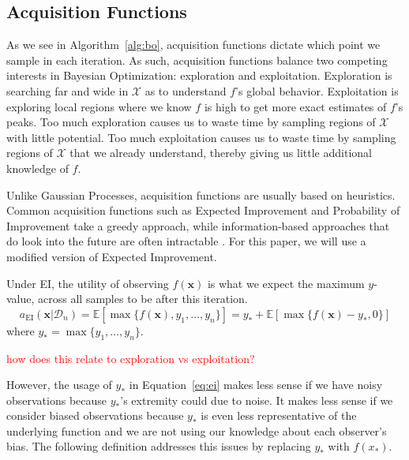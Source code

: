 \subsection{Acquisition Functions}
As we see in Algorithm~\ref{alg:bo}, acquisition functions dictate which point we sample in each iteration.
As such, acquisition functions balance two competing interests in Bayesian Optimization: exploration and exploitation.
Exploration is searching far and wide in $\mathcal{X}$ as to understand $f$'s global behavior.
Exploitation is exploring local regions where we know $f$ is high to get more exact estimates of $f$'s peaks.
Too much exploration causes us to waste time by sampling regions of $\mathcal{X}$ with little potential.
Too much exploitation causes us to waste time by sampling regions of $\mathcal{X}$ that we already understand, thereby giving us little additional knowledge of $f$.

Unlike Gaussian Processes, acquisition functions are usually based on heuristics.
Common acquisition functions such as Expected Improvement and Probability of Improvement take a greedy approach, while information-based approaches that do look into the future are often intractable \cite{shahriari2016}.
For this paper, we will use a modified version of Expected Improvement.

Under EI, the utility of observing $f(\mathbf{x})$ is what we expect the maximum $y$-value,
across all samples to be after this iteration.
\begin{equation}
    \label{eq:ei}
    a_{\mathrm{EI}}(\mathbf{x} | \mathcal{D}_n) = \mathbb{E}[\max\{f(\mathbf{x}), y_1, \dots, y_n\}]
    = y_* + \mathbb{E}[\max\{f(\mathbf{x}) - y_*, 0\}]
\end{equation}
where $y_* = \max\{y_1, \dots, y_n\}$.

\textcolor{red}{how does this relate to exploration vs exploitation?}

However, the usage of $y_*$ in Equation~\ref{eq:ei} makes less sense if we have noisy observations because $y_*$'s extremity could due to noise.
It makes less sense if we consider biased observations because $y_*$ is even less representative of the underlying function and we are not using our knowledge about each observer's bias.
The following definition addresses this issues by replacing $y_*$ with $f(x_*)$.

